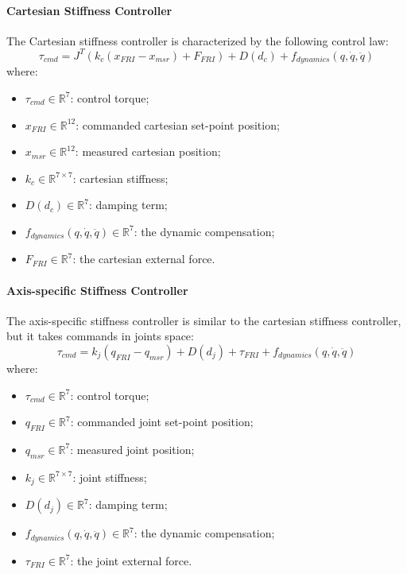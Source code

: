 \paragraph{Cartesian Stiffness Controller}
The Cartesian stiffness controller is characterized by the following control law:
\begin{equation}
\tau_{cmd} = J^T(k_c(x_{FRI} - x_{msr}) + F_{FRI}) + D(d_c) + f_{dynamics}(q,\dot{q},\ddot{q})
\label{eq:cartesianstiffnesscontroller}
\end{equation}
where:
\begin{itemize}
\item $\tau_{cmd}\in\mathbb{R}^7$: control torque;
\item $x_{FRI}\in\mathbb{R}^{12}$: commanded cartesian set-point position;
\item $x_{msr}\in\mathbb{R}^{12}$: measured cartesian position;
\item $k_c\in\mathbb{R}^{7\times 7}$: cartesian stiffness;
\item $D(d_c)\in\mathbb{R}^7$: damping term;
\item $f_{dynamics}(q,\dot{q},\ddot{q})\in\mathbb{R}^7$: the dynamic compensation;
\item $F_{FRI}\in\mathbb{R}^7$: the cartesian external force.
\end{itemize}

\paragraph{Axis-specific Stiffness Controller}
The axis-specific stiffness controller is similar to the cartesian stiffness controller, but it takes commands in joints space:
\begin{equation}
\tau_{cmd} = k_j(q_{FRI} - q_{msr}) + D(d_j) + \tau_{FRI} + f_{dynamics}(q,\dot{q},\ddot{q})
\label{eq:axisspecificstiffnesscontroller}
\end{equation}
where:
\begin{itemize}
\item $\tau_{cmd}\in \mathbb{R}^7$: control torque;
\item $q_{FRI}\in\mathbb{R}^7$: commanded joint set-point position;
\item $q_{msr}\in\mathbb{R}^7$: measured joint position;
\item $k_j\in\mathbb{R}^{7\times 7}$: joint stiffness;
\item $D(d_j)\in\mathbb{R}^7$: damping term;
\item $f_{dynamics}(q,\dot{q},\ddot{q})\in\mathbb{R}^7$: the dynamic compensation;
\item $\tau_{FRI}\in\mathbb{R}^7$: the joint external force.
\end{itemize}


